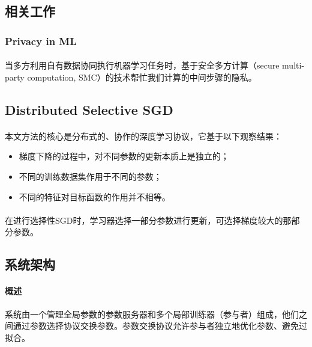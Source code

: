\documentclass[12pt,a4paper]{article}
\begin{document}
\subsection{相关工作}
\subsubsection{Privacy in ML}
\paragraph{} 当多方利用自有数据协同执行机器学习任务时，基于安全多方计算（secure multi-party computation, SMC）的技术帮忙我们计算的中间步骤的隐私。

\subsection{Distributed Selective SGD}
\paragraph{} 本文方法的核心是分布式的、协作的深度学习协议，它基于以下观察结果：
\begin{itemize}
	\item 梯度下降的过程中，对不同参数的更新本质上是独立的；
	\item 不同的训练数据集作用于不同的参数；
	\item 不同的特征对目标函数的作用并不相等。
\end{itemize}
\paragraph{} 在进行选择性SGD时，学习器选择一部分参数进行更新，可选择梯度较大的那部分参数。
\subsection{系统架构}
\paragraph{概述} 系统由一个管理全局参数的参数服务器和多个局部训练器（参与者）组成，他们之间通过参数选择协议交换参数。参数交换协议允许参与者独立地优化参数、避免过拟合。
\end{document}
